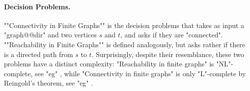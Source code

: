 \paragraph*{Decision Problems.}
\AP""Connectivity in Finite Graphs"" is the decision problems
that takes as input a "graph@@dir" and two vertices $s$ and $t$,
and asks if they are "connected".
\AP ""Reachability in Finite Graphs"" is defined analogously,
but asks rather if there is a directed path from $s$ to $t$.
Surprisingly, despite their resemblance, these two problems have a distinct complexity:
"Reachability in finite graphs" is "NL"-complete, see "eg"
\cite[Theorem~4.18]{AroraBarak2009ComputationalComplexity}, while "Connectivity in finite graphs"
is only "L"-complete by Reingold's theorem, see "eg"
\cite[Theorem~4.18]{AroraBarak2009ComputationalComplexity}.